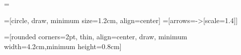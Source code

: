 \usepackage{mathtools}
\usepackage{amsfonts}
\usepackage{amsthm}
\usepackage{amssymb}
\usepackage{stmaryrd}

\usepackage{mathpartir}

\usepackage{array}
\usepackage{tabu}

\usepackage{dashbox}

\usepackage{pftools}

\usepackage{xcolor}  %

\usepackage{graphicx}
\usepackage{tikz}
\usepackage{scalerel}

\usepackage{rotating}
\usepackage{xparse}
\usepackage{xstring}
\usepackage{semantic}
\usepackage{csquotes}

\usepackage{hyperref}


\extrarowheight=\jot	%


\usetikzlibrary{shapes}
\usetikzlibrary{arrows}
\usetikzlibrary{calc}
\usetikzlibrary{arrows.meta}
=[circle, draw, minimum size=1.2cm, align=center]
=[arrows={->[scale=1.4]}]

=[rounded corners=2pt, thin, align=center, draw, minimum width=4.2cm,minimum height=0.8cm]

